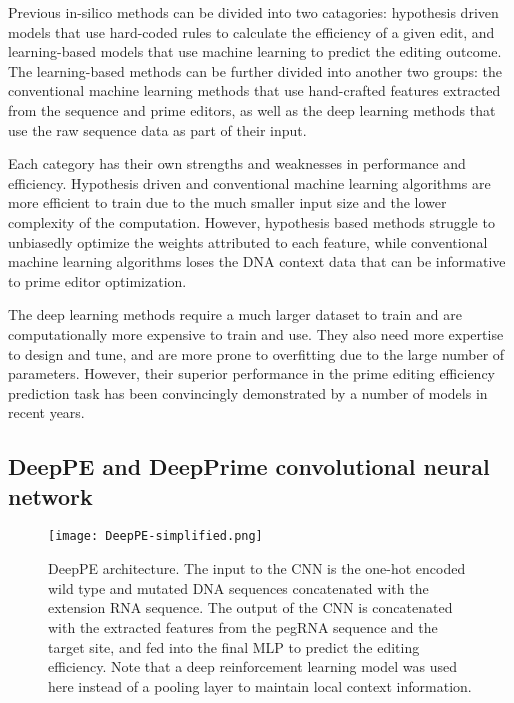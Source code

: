 Previous in-silico methods can be divided into two catagories: hypothesis driven models that use hard-coded rules to calculate the efficiency of a given edit\cite{hsuPrimeDesignSoftwareRapid2021,hwangPEDesignerPEAnalyzerWebbased2021}, and learning-based models that use machine learning to predict the editing outcome. 
The learning-based methods can be further divided into another two groups: the conventional machine learning methods that use hand-crafted features extracted from the sequence and prime editors\cite{liEasyPrimeMachineLearning2021,koeppelPredictionPrimeEditing2023}, as well as the deep learning methods that use the raw sequence data as part of their input\cite{yuPredictionEfficienciesDiverse2023,kimPredictingEfficiencyPrime2021, mathisPredictingPrimeEditing2023}. 

Each category has their own strengths and weaknesses in performance and efficiency. Hypothesis driven and conventional machine learning algorithms are more efficient to train due to the much smaller input size and the lower complexity of the computation. However, hypothesis based methods struggle to unbiasedly optimize the weights attributed to each feature\cite{liEasyPrimeMachineLearning2021}, while conventional machine learning algorithms loses the DNA context data that can be informative to prime editor optimization. 

The deep learning methods require a much larger dataset to train and are computationally more expensive to train and use. They also need more expertise to design and tune, and are more prone to overfitting due to the large number of parameters. However, their superior performance in the prime editing efficiency prediction task has been convincingly demonstrated by a number of models in recent years.


\subsection{DeepPE and DeepPrime convolutional neural network}

\begin{figure}
    \centering
    \texttt{[image: DeepPE-simplified.png]}
    \caption[DeepPE architecture]{DeepPE architecture. The input to the CNN is the one-hot encoded wild type and mutated DNA sequences concatenated with the extension RNA sequence. The output of the CNN is concatenated with the extracted features from the pegRNA sequence and the target site, and fed into the final MLP to predict the editing efficiency. Note that a deep reinforcement learning model was used here instead of a pooling layer to maintain local context information.}
    \label{fig:deeppe}
\end{figure}

